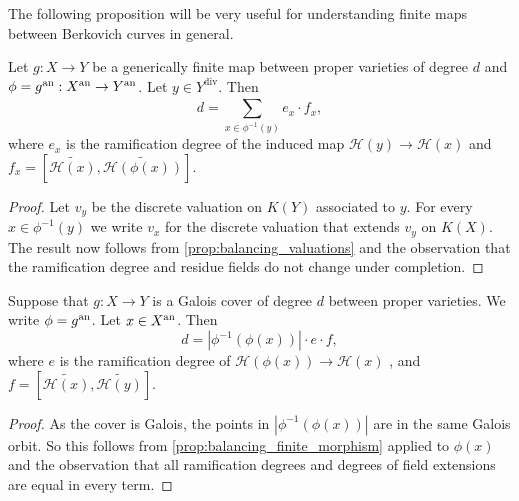 The following proposition will be very useful for understanding finite maps between Berkovich curves in general. 
\begin{proposition}\label{prop:balancing_finite_morphism}
	Let $g: X \to Y$ be a generically finite map between proper varieties of degree $d$ and $\phi = g\an: X\an \to Y\an$. 
	Let $y \in Y^{\text{div}}$. 
	Then 
	\[
		d = \sum_{x \in \phi^{-1}(y)}^{} e_{x} \cdot  f_{x} 
	,\] 
	where $e_x$ is the ramification degree of the induced map  $\mathcal{H} (y) \to \mathcal{H} (x)$ and $f_x = \left[\widetilde{\mathcal{H} (x)}, \widetilde {\mathcal{H} (\phi(x))}\right]$.
\end{proposition}
\begin{proof}
	Let $v_y$ be the discrete valuation on $K(Y)$ associated to $y$. 
	For every $x \in \phi^{-1}(y)$ we write $v_x$ for the discrete valuation that extends $v_y$ on $K(X)$. 
	The result now follows from \cref{prop:balancing_valuations} and the observation that the ramification degree and residue fields do not change under completion. 
\end{proof}

\begin{corollary}\label{cor:balancing_galois_cover}
	Suppose that $g: X \to Y$ is a Galois cover of degree $d$ between proper varieties. 
	We write $\phi = g\an$. 
	Let $x \in X{}^{\text{an}}$. 
	Then \[
		d = |\phi^{-1}(\phi(x))| \cdot e\cdot f
	,\] 
	where $e$ is the ramification degree of $\mathcal{H} (\phi(x)) \to \mathcal{H} (x)$ , and  $f = \left[\widetilde{\mathcal{H} (x)}, \widetilde {\mathcal{H} (y)}\right]$.
\end{corollary}
\begin{proof}
	As the cover is Galois, the points in $|\phi^{-1}(\phi(x))|$ are in the same Galois orbit.
	So this follows from \cref{prop:balancing_finite_morphism} applied to $\phi(x)$ and the observation that all ramification degrees and degrees of field extensions are equal in every term. 
\end{proof}

